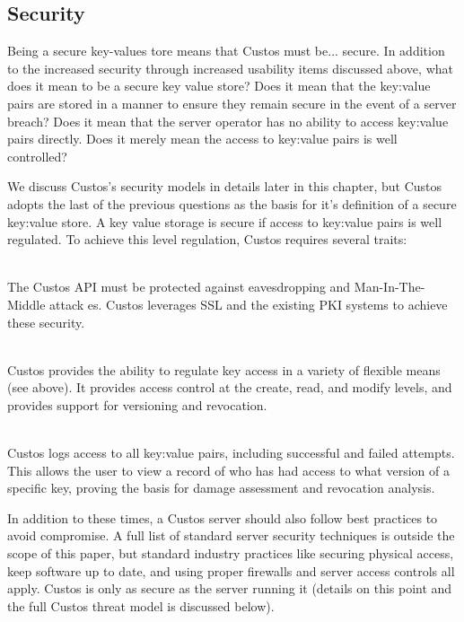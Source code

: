 \subsection{Security}

Being a secure key-values tore means that Custos must be... secure.
In addition to the increased security through increased usability
items discussed above, what does it mean to be a secure key value
store? Does it mean that the key:value pairs are stored in a manner to
ensure they remain secure in the event of a server breach? Does it
mean that the server operator has no ability to access key:value pairs
directly. Does it merely mean the access to key:value pairs is well
controlled?

We discuss Custos's security models in details later in this chapter,
but Custos adopts the last of the previous questions as the basis for
it's definition of a secure key:value store. A key value storage is
secure if access to key:value pairs is well regulated. To achieve this
level regulation, Custos requires several traits:

\begin{packed_desc}
\item[Secure Communication Primitives] \hfill \\ The Custos API must
  be protected against eavesdropping and Man-In-The-Middle attack
  es. Custos leverages SSL and the existing PKI systems to achieve
  these security.
\item[Access Control] \hfill \\ Custos provides the ability to
  regulate key access in a variety of flexible means (see above). It
  provides access control at the create, read, and modify levels, and
  provides support for versioning and revocation.
\item[Access Auditing] \hfill \\ Custos logs access to all key:value
  pairs, including successful and failed attempts. This allows the
  user to view a record of who has had access to what version of a
  specific key, proving the basis for damage assessment and revocation
  analysis.
\end{packed_desc}

In addition to these times, a Custos server should also follow best
practices to avoid compromise. A full list of standard server security
techniques is outside the scope of this paper, but standard industry
practices like securing physical access, keep software up to date, and
using proper firewalls and server access controls all apply. Custos is
only as secure as the server running it (details on this point and the
full Custos threat model is discussed below).

